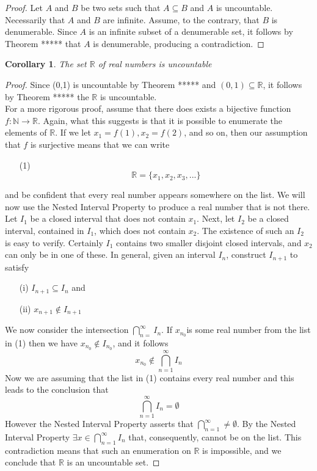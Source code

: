 \documentclass[10pt]{report}
\newtheorem{cor2}{Corollary}[section]
\begin{document}
\begin{proof}
Let $A$ and $B$ be two sets such that $A\subseteq B$ and $A$ is uncountable. Necessarily that $A$ and $B$ are infinite. Assume, to the contrary, that $B$ is denumerable. Since $A$ is an infinite subset of a denumerable set, it follows by Theorem ***** that $A$ is denumerable, producing a contradiction.
\end{proof}
\begin{cor2}
The set $\mathbb{R}$ of real numbers is uncountable
\end{cor2}
\begin{proof}
Since (0,1) is uncountable by Theorem ***** and $(0,1)\subseteq \mathbb{R}$, it follows by Theorem ***** the $\mathbb{R}$ is uncountable.\\
For a more rigorous proof, assume that there does exists a bijective function $f:\mathbb{N} \to \mathbb{R}$. Again, what this suggests is that it is possible to enumerate the elements of $\mathbb{R}$. If we let $x_1 = f(1), x_2 = f(2)$, and so on, then our assumption that $f$ is surjective means that we can write
\begin{itemize}
\item[(1)]$$\mathbb{R} =\{x_1,x_2,x_3,...\}$$
\end{itemize}
and be confident that every real number appears somewhere on the list. We will now use the Nested Interval Property to produce a real number that is not there.\\
Let $I_1$ be a closed interval that does not contain $x_1$. Next, let $I_2$ be a closed interval, contained in $I_1$, which does not contain $x_2$. The existence of such an $I_2$ is easy to verify. Certainly $I_1$ contains two smaller disjoint closed intervals, and $x_2$ can only be in one of these. In general, given an interval $I_n$, construct $I_{n+1}$ to satisfy
\begin{itemize}
\item[(i)] $I_{n+1}\subseteq I_n$ and
\item[(ii)] $x_{n+1} \notin I_{n+1}$
\end{itemize}
We now consider the intersection $\bigcap_{n=}^\infty I_n$. If $x_{n_0}$is some real number from the list in (1) then we have $x_{n_0}\notin I_{n_0}$, and it follows 
$$x_{n_0} \notin\bigcap_{n=1}^\infty I_n$$
Now we are assuming that the list in (1) contains every real number and this leads to the conclusion that
$$\bigcap_{n=1}^\infty I_n = \emptyset$$
However the Nested Interval Property asserts that $\bigcap_{n=1}^\infty \neq \emptyset.$ By the Nested Interval Property $\exists x\in\bigcap_{n=1}^\infty I_n$ that, consequently, cannot be on the list. This contradiction means that such an enumeration on $\mathbb{R}$ is impossible, and we conclude that $\mathbb{R}$ is an uncountable set.
\end{proof}
\end{document}
